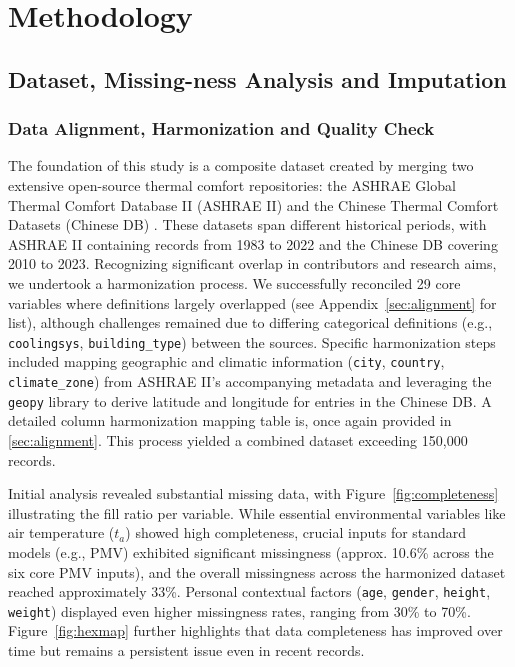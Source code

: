 \section{Methodology}

\subsection{Dataset, Missing-ness Analysis and Imputation}
\subsubsection{Data Alignment, Harmonization and Quality Check}
The foundation of this study is a composite dataset created by merging two extensive open-source thermal comfort repositories: the ASHRAE Global Thermal Comfort Database II (ASHRAE II) \cite{foldvary2018ashrae} and the Chinese Thermal Comfort Datasets (Chinese DB) \cite{yang2023chinese}. These datasets span different historical periods, with ASHRAE II containing records from 1983 to 2022 and the Chinese DB covering 2010 to 2023. Recognizing significant overlap in contributors and research aims, we undertook a harmonization process. We successfully reconciled 29 core variables where definitions largely overlapped (see Appendix~\ref{sec:alignment} for list), although challenges remained due to differing categorical definitions (e.g., \texttt{coolingsys}, \texttt{building\_type}) between the sources. Specific harmonization steps included mapping geographic and climatic information (\texttt{city}, \texttt{country}, \texttt{climate\_zone}) from ASHRAE II's accompanying metadata and leveraging the \texttt{geopy} library \cite{Geopy} to derive latitude and longitude for entries in the Chinese DB. A detailed column harmonization mapping table is, once again provided in \ref{sec:alignment}. This process yielded a combined dataset exceeding 150,000 records.

Initial analysis revealed substantial missing data, with Figure~\ref{fig:completeness} illustrating the fill ratio per variable. While essential environmental variables like air temperature ($t_a$) showed high completeness, crucial inputs for standard models (e.g., PMV) exhibited significant missingness (approx. 10.6\% across the six core PMV inputs), and the overall missingness across the harmonized dataset reached approximately 33\%. Personal contextual factors (\texttt{age}, \texttt{gender}, \texttt{height}, \texttt{weight}) displayed even higher missingness rates, ranging from 30\% to 70\%. Figure~\ref{fig:hexmap} further highlights that data completeness has improved over time but remains a persistent issue even in recent records.

